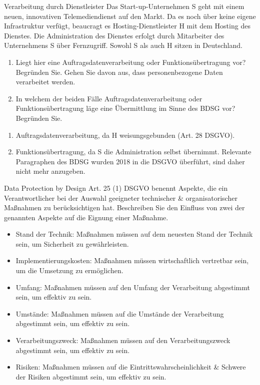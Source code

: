 \documentclass{article}
\begin{document}
\begin{exercise}{Verarbeitung durch Dienstleister}
  Das Start-up-Unternehmen S geht mit einem neuen, innovativen Telemediendienst auf den Markt. Da es noch über keine eigene Infrastruktur verfügt, beaucragt es Hosting-Dienstleister H mit dem Hosting des Dienstes. Die Administration des Dienstes erfolgt durch Mitarbeiter des Unternehmens S über Fernzugriff. Sowohl S als auch H sitzen in Deutschland.
  \begin{enumerate}
    \item Liegt hier eine Auftragsdatenverarbeitung oder Funktionsübertragung vor? Begründen Sie. Gehen Sie davon aus, dass personenbezogene Daten verarbeitet werden.
    \item In welchem der beiden Fälle Auftragsdatenverarbeitung oder Funktionsübertragung läge eine Übermittlung im Sinne des BDSG vor? Begründen Sie.
  \end{enumerate}

  \begin{solution}
    \begin{enumerate}
      \item Auftragsdatenverarbeitung, da H weisungsgebunden (Art. 28 DSGVO).
      \item Funktionsübertragung, da S die Administration selbst übernimmt. Relevante Paragraphen des BDSG wurden 2018 in die DSGVO überführt, sind daher nicht mehr anzugeben.
    \end{enumerate}
  \end{solution}
\end{exercise}

\begin{exercise}{Data Protection by Design}
  Art. 25 (1) DSGVO benennt Aspekte, die ein Verantwortlicher bei der Auswahl geeigneter technischer \& organisatorischer Maßnahmen zu berücksichtigen hat. Beschreiben Sie den Einfluss von zwei der genannten Aspekte auf die Eignung einer Maßnahme.

  \begin{solution}
    \begin{itemize}
      \item Stand der Technik: Maßnahmen müssen auf dem neuesten Stand der Technik sein, um Sicherheit zu gewährleisten.
      \item Implementierungskosten: Maßnahmen müssen wirtschaftlich vertretbar sein, um die Umsetzung zu ermöglichen.
      \item Umfang: Maßnahmen müssen auf den Umfang der Verarbeitung abgestimmt sein, um effektiv zu sein.
      \item Umstände: Maßnahmen müssen auf die Umstände der Verarbeitung abgestimmt sein, um effektiv zu sein.
      \item Verarbeitungszweck: Maßnahmen müssen auf den Verarbeitungszweck abgestimmt sein, um effektiv zu sein.
      \item Risiken: Maßnahmen müssen auf die Eintrittswahrscheinlichkeit \& Schwere der Risiken abgestimmt sein, um effektiv zu sein.
    \end{itemize}
  \end{solution}
\end{exercise}
\end{document}

